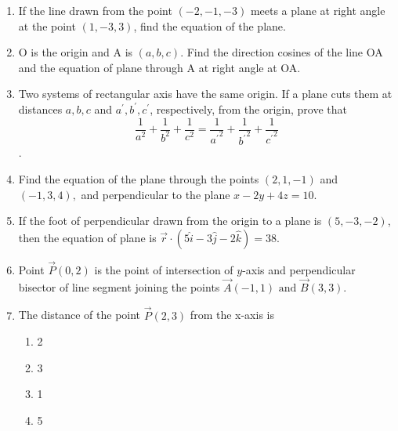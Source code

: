 \begin{enumerate}[label=\thesubsection.\arabic*,ref=\thesubsection.\theenumi]
\item If the line drawn from the point $(-2,-1,-3)$ meets a plane at right angle at the point $(1,-3,3)$, find the equation of the plane.
\item O is the origin and A is $(a,b,c)$. Find the direction cosines of the line OA and the equation of plane through A at right angle at OA.
\item Two systems of rectangular axis have the same origin. If a plane cuts them at distances $a,b,c$ and $a^{\prime},b^{\prime},c^{\prime}$, respectively, from the origin, prove that $$\frac{1}{a^2}+\frac{1}{b^2}+\frac{1}{c^2}=\frac{1}{{a^{\prime}}^2}+\frac{1}{{b^{\prime}}^2}+\frac{1}{{c^{\prime}}^2}$$.
\item Find the equation of the plane through the points $(2,1,-1)$ and $(-1,3,4),$ and 
perpendicular to the plane $x-2y+4z=10.$
\item If the foot of perpendicular drawn from the origin to a plane is $(5,-3,-2)$, then the equation of plane is $\overrightarrow{r} \cdot (5\hat{i}-3\hat{j}-2\hat{k})=38.$
\item  Point $\vec{P}(0,2)$ is the point of intersection of $y$-axis and perpendicular bisector of line segment joining the points $\vec{A}(-1,1) \text{ and } \vec{B}(3,3)$.
	\item The distance of the point $\vec{P}(2, 3)$ from the x-axis is

\begin{enumerate}
\item 2
\item 3
\item 1
\item 5 
\end{enumerate}


\end{enumerate}
